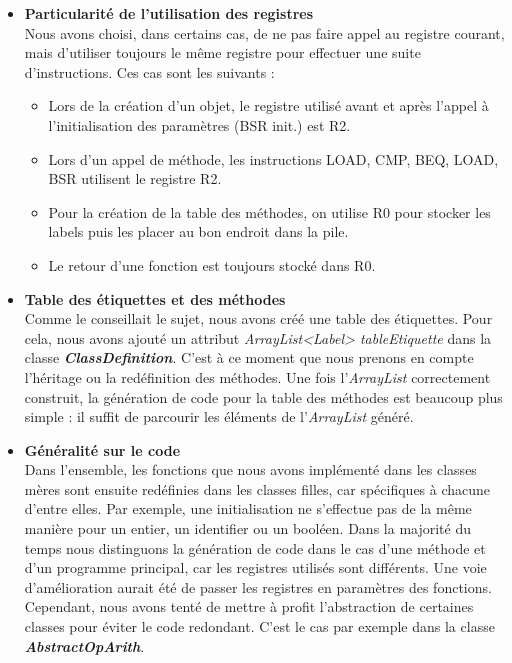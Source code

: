 \documentclass{article}
\begin{document}
\begin{itemize}
\item \textbf{Particularité de l'utilisation des registres} \newline
\\
Nous avons choisi, dans certains cas, de ne pas faire appel au registre courant, mais d'utiliser toujours le même registre pour effectuer une suite d'instructions.
Ces cas sont les suivants :
\begin{itemize}
\item Lors de la création d'un objet, le registre utilisé avant et après l'appel à l'initialisation des paramètres (BSR init.) est R2.
\item Lors d'un appel de méthode, les instructions LOAD, CMP, BEQ, LOAD, BSR utilisent le registre R2.
\item Pour la création de la table des méthodes, on utilise R0 pour stocker les labels puis les placer au bon endroit dans la pile.
\item Le retour d'une fonction est toujours stocké dans R0.
\end{itemize}

\item \textbf{Table des étiquettes et des méthodes} \newline
\\
Comme le conseillait le sujet, nous avons créé une table des étiquettes. 
Pour cela, nous avons ajouté un attribut \textit{ArrayList<Label> tableEtiquette} dans la classe \textit{\textbf{ClassDefinition}}. 
C'est à ce moment que nous prenons en compte l'héritage ou la redéfinition des méthodes.
Une fois l'\textit{ArrayList} correctement construit, la génération de code pour la table des méthodes est beaucoup plus simple : il suffit de parcourir les éléments de l'\textit{ArrayList} généré.

\item \textbf{Généralité sur le code} \newline
\\
Dans l'ensemble, les fonctions que nous avons implémenté dans les classes mères sont ensuite redéfinies dans les classes filles, car spécifiques à chacune d'entre elles. Par exemple,
une initialisation ne s'effectue pas de la même manière pour un entier, un identifier ou un booléen. \newline
Dans la majorité du temps nous distinguons la génération de code dans le cas d'une méthode et d'un programme principal, car les registres utilisés sont différents. 
Une voie d'amélioration aurait été de passer les registres en paramètres des fonctions. \newline
Cependant, nous avons tenté de mettre à profit l'abstraction de certaines classes pour éviter le code redondant. 
C'est le cas par exemple dans la classe \textit{\textbf{AbstractOpArith}}. \newline
\end{itemize}
\end{document}
